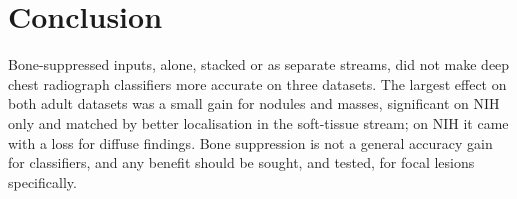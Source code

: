 \section{Conclusion}
Bone-suppressed inputs, alone, stacked or as separate streams, did not make deep chest radiograph classifiers more accurate on three
datasets. The largest effect on both adult datasets was a small gain for nodules and masses, significant on NIH only and matched by better
localisation in the soft-tissue stream; on NIH it came with a loss for diffuse findings. Bone suppression is not a general accuracy gain for classifiers, and
any benefit should be sought, and tested, for focal lesions specifically.

